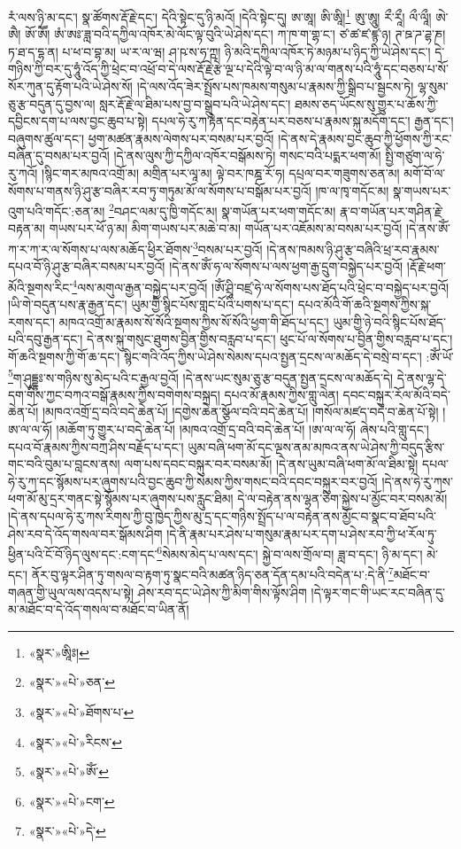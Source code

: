 རཾ་ལས་ཉི་མ་དང་། སྣ་ཚོགས་རྡོ་རྗེ་དང་། དེའི་སྟེང་དུ་ཉི་མའོ། །དེའི་སྟེང་དུ། ཨ་ཨཱ། ཨི་ཨཱི།\footnote{«སྣར་»ཨཱིཿ།} ཨུ་ཨཱུ། རྀ་རཱྀ། ལྀ་ལཱྀ། ཨེ་ཨཻ། ཨོ་ཨཽ། ཨཾ་ཨཿ་ཟླ་བའི་དཀྱིལ་འཁོར་མེ་ལོང་ལྟ་བུའི་ཡེ་ཤེས་དང་། ཀ་ཁ་ག་གྷ་ང་། ཙ་ཚ་ཛ་ཛྙ་ཉ། ཊ་ཋ་ཌ་ཌྷ་ཎ། ཏ་ཐ་ད་དྷ་ན། པ་ཕ་བ་བྷ་མ། ཡ་ར་ལ་ཝ། ཤ་ཥ་ས་ཧ་ཀྵ། ཉི་མའི་དཀྱིལ་འཁོར་ཏེ་མཉམ་པ་ཉིད་ཀྱི་ཡེ་ཤེས་དང་། དེ་གཉིས་ཀྱི་བར་དུ་ཧཱུཾ་འོད་ཀྱི་ཕྲེང་བ་འཕྲོ་བ་དེ་ལས་རྡོ་རྗེ་རྩེ་ལྔ་པ་དེའི་ལྟེ་བ་ལ་ཉི་མ་ལ་གནས་པའི་ཧཱུཾ་དང་བཅས་པ་སོ་སོར་ཀུན་དུ་རྟོག་པའི་ཡེ་ཤེས་སོ། །དེ་ལས་འོད་ཟེར་སྤྲོས་པས་ཁམས་གསུམ་པ་རྣམས་ཀྱི་སྒྲིབ་པ་སྦྱངས་ཏེ། ལྷ་སུམ་ཅུ་རྩ་བདུན་དུ་བྱས་ལ། སླར་རྡོ་རྗེ་ལ་ཐིམ་པས་བྱ་བ་སྒྲུབ་པའི་ཡེ་ཤེས་དང་། ཐམས་ཅད་ཡོངས་སུ་གྱུར་པ་ཆོས་ཀྱི་དབྱིངས་དག་པ་ལས་བྱང་ཆུབ་པ་སྟེ། དཔལ་ཧེ་རུ་ཀ་རྟེན་དང་བརྟེན་པར་བཅས་པ་རྣམས་སྐུ་མདོག་དང་། རྒྱན་དང་། བཞུགས་ཚུལ་དང་། ཕྱག་མཚན་རྣམས་ལེགས་པར་བསམ་པར་བྱའོ། །དེ་ནས་དེ་རྣམས་བྱང་ཆུབ་ཀྱི་ཕྱོགས་ཀྱི་རང་བཞིན་དུ་བསམ་པར་བྱའོ། །དེ་ནས་ལུས་ཀྱི་དཀྱིལ་འཁོར་བསྒོམས་ཏེ། གསང་བའི་པདྨར་ཕག་མོ། སྤྱི་གཙུག་ལ་ཧེ་རུ་ཀའོ། །སྙིང་གར་མཁའ་འགྲོ་མ། མགྲིན་པར་ལཱ་མ། ལྟེ་བར་ཁཎྜ་རོ་ཧ། དཔྲལ་བར་གཟུགས་ཅན་མ། མགོ་བོ་ལ་སོགས་པ་གནས་ཉི་ཤུ་རྩ་བཞིར་རབ་ཏུ་གཏུམ་མོ་ལ་སོགས་པ་བསྒོམ་པར་བྱའོ། །ཁ་ལ་ཁྭ་གདོང་མ། སྣ་གཡས་པར་འུག་པའི་གདོང་:ཅན་མ། \footnote{«སྣར་»«པེ་»ཅན་}བཤང་ལམ་དུ་ཁྱི་གདོང་མ། སྣ་གཡོན་པར་ཕག་གདོང་མ། རྣ་བ་གཡོན་པར་གཤིན་རྗེ་བརྟན་མ། གཡས་པར་ཕོ་ཉ་མ། མིག་གཡས་པར་མཆེ་བ་མ། གཡོན་པར་འཇོམས་མ་བསམ་པར་བྱའོ། །དེ་ནས་ཨོཾ་ཀ་ར་ཀ་ར་ལ་སོགས་པ་ལས་མཆོད་ཕྱིར་ཐོགས་\footnote{«སྣར་»«པེ་»ཐོགས་པ་}བསམ་པར་བྱའོ། །དེ་ནས་ཁམས་ཉི་ཤུ་རྩ་བཞིའི་ཕྲ་རབ་རྣམས་དཔའ་བོ་ཉི་ཤུ་རྩ་བཞིར་བསམ་པར་བྱའོ། །དེ་ནས་ཨོཾ་ཧ་ལ་སོགས་པ་ལས་ཕྱག་རྒྱ་དྲུག་བསྐྱེད་པར་བྱའོ། །རྡོ་རྗེ་ཕག་མོའི་སྔགས་རིང་\footnote{«སྣར་»«པེ་»རིངས་}ལས་མགུལ་རྒྱན་བསྐྱེད་པར་བྱའོ། །ཨོཾ་ཤྲཱི་བཛྲ་ཧེ་ལ་སོགས་པས་ཐོད་པའི་ཕྲེང་བ་བསྐྱེད་པར་བྱའོ། །ཡི་གེ་བདུན་པས་རྣ་རྒྱན་དང་། ཡུམ་གྱི་སྙིང་པོས་གླང་པོའི་པགས་པ་དང་། དཔའ་མོའི་གོ་ཆའི་སྔགས་ཀྱིས་སྐ་རགས་དང་། མཁའ་འགྲོ་མ་རྣམས་སོ་སོའི་སྔགས་ཀྱིས་སོ་སོའི་ཕྱག་གི་ཐོད་པ་དང་། ཡུམ་གྱི་ཉེ་བའི་སྙིང་པོས་ཐོད་པའི་དབུ་རྒྱན་དང་། དེ་ནས་སྐུ་གསུང་ཐུགས་བྱིན་གྱིས་བརླབ་པ་དང་། ཕུང་པོ་ལ་སོགས་པ་བྱིན་གྱིས་བརླབ་པ་དང་། གོ་ཆའི་སྔགས་ཀྱི་གོ་ཆ་དང་། སྙིང་གའི་འོད་ཀྱིས་ཡེ་ཤེས་སེམས་དཔའ་སྤྱན་དྲངས་ལ་མཆོད་དེ་བསྲེ་བ་དང་། :ཨོཾ་ཡོ་\footnote{«སྣར་»«པེ་»ཨོཾ་}ག་ཤུདྡྷཿ་ས་གཉིས་སུ་མེད་པའི་ང་རྒྱལ་བྱའོ། །དེ་ནས་ཡང་སུམ་ཅུ་རྩ་བདུན་སྤྱན་དྲངས་ལ་མཆོད་དེ། དེ་ནས་ལྷ་དེ་དག་གིས་ཀྱང་བཀའ་བསྒོ་རྣམས་ཀྱིས་བགེགས་བསྐྲད། དཔའ་མོ་རྣམས་ཀྱིས་གླུ་ལེན། དབང་བསྐུར་རོལ་མོའི་བདེ་ཆེན་པོ། །མཁའ་འགྲོ་དྲ་བའི་བདེ་ཆེན་པོ། །དགྱེས་ཆེན་སྩོལ་བའི་བདེ་ཆེན་པོ། །གསོལ་མཛད་བདེ་བ་ཆེན་པོ་སྟེ། །ཨ་ལ་ལ་ཧོ། །མཆོག་ཏུ་གྱུར་པ་བདེ་ཆེན་པོ། །མཁའ་འགྲོ་དྲ་བའི་བདེ་ཆེན་པོ། །ཨ་ལ་ལ་ཧོ། ཞེས་པའི་གླུ་དང་། དཔའ་བོ་རྣམས་ཀྱིས་བཀྲ་ཤིས་བརྗོད་པ་དང་། ཡུམ་བཞི་ཕག་མོ་དང་ལྔས་ནམ་མཁའ་ནས་ཡེ་ཤེས་ཀྱི་བདུད་རྩིས་གང་བའི་བུམ་པ་བླངས་ནས། ལག་པས་དབང་བསྐུར་བར་བསམ་མོ། །དེ་ནས་ཡུམ་བཞི་ཕག་མོ་ལ་ཐིམ་སྟེ། དཔལ་ཧེ་རུ་ཀ་དང་སྙོམས་པར་ཞུགས་པའི་བྱང་ཆུབ་ཀྱི་སེམས་ཀྱིས་གསང་བའི་དབང་བསྐུར་བར་བྱའོ། །དེ་ནས་ཧེ་རུ་ཀས་ཕག་མོ་མུ་དྲར་གནང་སྟེ་སྙོམས་པར་ཞུགས་པས་རླུང་ཐིམ། དེ་ལ་བརྟེན་ནས་ལྷན་ཅིག་སྐྱེས་པ་མྱོང་བར་བསམ་མོ། །དེ་ནས་དཔལ་ཧེ་རུ་ཀས་རིགས་ཀྱི་བུ་ཁྱེད་ཀྱིས་མུ་དྲ་དང་གཉིས་སྤྲོད་པ་ལ་བརྟེན་ནས་མྱོང་བ་སྣང་བ་ཐོབ་པའི་ཤེས་རབ་དེ་འོད་གསལ་བར་སྒོམས་ཤིག །དེ་ནི་རྣམ་པར་ཤེས་པ་གསུམ་རྣམ་པར་དག་པ་ཤེས་རབ་ཀྱི་ཕ་རོལ་ཏུ་ཕྱིན་པའི་ངོ་བོ་ཉིད་ལུས་དང་:ངག་དང་\footnote{«སྣར་»«པེ་»ངག་}སེམས་མེད་པ་ལས་དང་། སྐྱེ་བ་ལས་གྲོལ་བ། ཟླ་བ་དང་། ཉི་མ་དང་། མེ་དང་། ནོར་བུ་ལྟར་ཤིན་ཏུ་གསལ་བ་རྟག་ཏུ་སྣང་བའི་མཚན་ཉིད་ཅན་དོན་དམ་པའི་བདེན་པ་:དེ་ནི་\footnote{«སྣར་»«པེ་»དེ་}མཐོང་བ་གཞན་གྱི་ཡུལ་ལས་འདས་པ་སྟེ། ཤེས་རབ་དང་ཡེ་ཤེས་ཀྱི་མིག་གིས་ལྟོས་ཤིག །དེ་ལྟར་གང་གི་ཡང་རང་བཞིན་དུ་མ་མཐོང་བ་དེ་འོད་གསལ་བ་མཐོང་བ་ཡིན་ནོ། 
